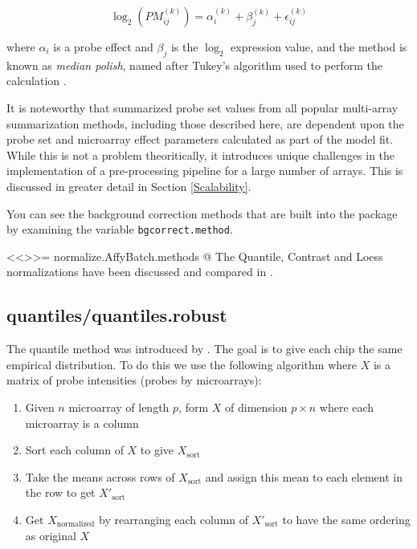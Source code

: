 \begin{equation}
\label{medianpolish}
\log_2\left(PM^{(k)}_{ij}\right) = \alpha_i^{(k)} + \beta_j^{(k)} + \epsilon_{ij}^{(k)}
\end{equation}

where $\alpha_i$ is a probe effect and $\beta_j$ is the $\log_2$ expression
value, and the method is known as \emph{median polish}, named after Tukey's
algorithm used to perform the calculation \cite{tukey:1977}.

It is noteworthy that summarized probe set values from all popular multi-array
summarization methods, including those described here, are dependent upon the
probe set and microarray effect parameters calculated as part of the model fit.
While this is not a problem theoritically, it introduces unique challenges in
the implementation of a pre-processing pipeline for a large number of arrays.
This is discussed in greater detail in Section \ref{Scalability}.


You can see the background correction methods that are built into the package
by examining the variable \verb+bgcorrect.method+.

<<>>=
normalize.AffyBatch.methods
@
The Quantile, Contrast and Loess normalizations have been discussed and compared in \cite{PMID_12538238}.

\subsection{quantiles/quantiles.robust}

The quantile method was introduced by \cite{PMID_12538238}. The goal is to give each chip the same empirical distribution. To do this we use the following algorithm where $X$ is a matrix of probe intensities (probes by microarrays):

\begin{enumerate}
\item Given $n$ microarray of length $p$, form $X$  of dimension $p \times n$  where
each microarray is a column
\item Sort each column of $X$ to give $X_{\mbox{sort}}$
\item Take the means across rows of $X_{\mbox{sort}}$ and assign this mean to each element in the row to get $X'_{\mbox{sort}}$
\item Get $X_{\mbox{normalized}}$ by rearranging each column of $X'_{\mbox{sort}}$ to have the same ordering as original $X$
\end{enumerate}

